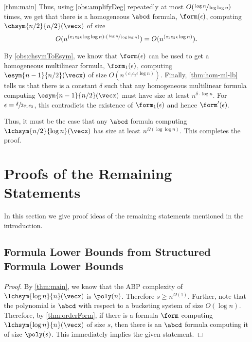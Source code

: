 \begin{proofof}{\autoref{thm:main}}
	Thus, using \autoref{obs:amplifyDeg} repeatedly at most $O(\sfrac{\log n}{\log \log n})$ times, we get that there is a homogeneous $\abcd$ formula, $\form(\epsilon)$, computing $\chsym{n/2}{n/2}(\vecx)$ of size
	\[
		O(n^{(c_1 c_2 \epsilon \log \log n) \cdot (\sfrac{\log n}{\log \log n})}) = O(n^{(c_1 c_2 \epsilon \log n)}).
	\]
	
	By \autoref{obs:chsymToEsym}, we know that $\form(\epsilon)$ can be used to get a homogeneous multilinear formula, $\form_1(\epsilon)$, computing $\esym{n-1}{n/2}(\vecx)$ of size $O(n^{(c_1 c_2 \epsilon \log n)})$.
	Finally, \autoref{thm:hom-ml-lb} tells us that there is a constant $\delta$ such that any homogeneous multilinear formula computing $\esym{n-1}{n/2}(\vecx)$ must have size at least $n^{\delta \cdot \log n}$.	
	For $\epsilon = \sfrac{\delta}{2 c_1 c_2}$, this contradicts the existence of $\form_1(\epsilon)$ and hence $\form'(\epsilon)$.

	Thus, it must be the case that any $\abcd$ formula computing $\lchsym{n/2}{\log n}(\vecx)$ has size at least $n^{\Omega(\log \log n)}$.
	This completes the proof.
\end{proofof}

\section{Proofs of the Remaining Statements}\label{sec:simpleStatements}

In this section we give proof ideas of the remaining statements mentioned in the introduction.

\subsection{Formula Lower Bounds from Structured Formula Lower Bounds}\label{sec:FormLBfromOrdFormLB}

\FormLBfromOrdFormLB*

\begin{proof}
	By \autoref{thm:main}, we know that the ABP complexity of $\lchsym{\log n}{n}(\vecx)$ is $\poly(n)$.
	Therefore $s \geq n^{\Omega(1)}$.
	Further, note that the polynomial is $\abcd$ with respect to a bucketing system of size $O(\log n)$.
	Therefore, by \autoref{thm:orderForm}, if there is a formula $\form$ computing $\lchsym{\log n}{n}(\vecx)$ of size $s$, then there is an $\abcd$ formula computing it of size $\poly(s)$.
	This immediately implies the given statement.
\end{proof}

